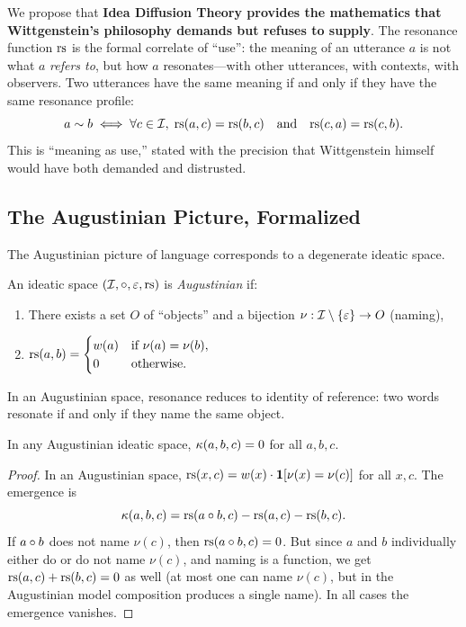 We propose that \textbf{Idea Diffusion Theory provides the mathematics that
Wittgenstein's philosophy demands but refuses to supply}. The resonance
function $\mathrm{rs}$ is the formal correlate of ``use'': the meaning of an
utterance $a$ is not what $a$ \emph{refers to}, but how $a$ resonates---with
other utterances, with contexts, with observers. Two utterances have the same
meaning if and only if they have the same resonance profile:
\[
  a \sim b \iff \forall c \in \mathcal{I},\; \mathrm{rs}(a, c) = \mathrm{rs}(b, c)
  \quad\text{and}\quad \mathrm{rs}(c, a) = \mathrm{rs}(c, b).
\]
This is ``meaning as use,'' stated with the precision that Wittgenstein
himself would have both demanded and distrusted.


\subsection{The Augustinian Picture, Formalized}

The Augustinian picture of language corresponds to a degenerate ideatic space.

\begin{definition}
\label{def:augustinian}
An ideatic space $(\mathcal{I}, \circ, \varepsilon, \mathrm{rs})$ is \emph{Augustinian} if:
\begin{enumerate}
\item There exists a set $O$ of ``objects'' and a bijection $\nu : \mathcal{I} \setminus \{\varepsilon\} \to O$ (naming),
\item $\mathrm{rs}(a, b) = \begin{cases} w(a) & \text{if } \nu(a) = \nu(b), \\ 0 & \text{otherwise}.\end{cases}$
\end{enumerate}
In an Augustinian space, resonance reduces to identity of reference:
two words resonate if and only if they name the same object.
\end{definition}

\begin{proposition}
\label{prop:augustinian-zero-emergence}
In any Augustinian ideatic space, $\kappa(a, b, c) = 0$ for all $a, b, c$.
\end{proposition}

\begin{proof}
In an Augustinian space, $\mathrm{rs}(x, c) = w(x) \cdot \mathbf{1}[\nu(x) = \nu(c)]$
for all $x, c$. The emergence is
\[
\kappa(a,b,c) = \mathrm{rs}(a \circ b, c) - \mathrm{rs}(a, c) - \mathrm{rs}(b, c).
\]
If $a \circ b$ does not name $\nu(c)$, then $\mathrm{rs}(a \circ b, c) = 0$. But
since $a$ and $b$ individually either do or do not name $\nu(c)$, and naming
is a function, we get $\mathrm{rs}(a,c) + \mathrm{rs}(b,c) = 0$ as well (at most one can name
$\nu(c)$, but in the Augustinian model composition produces a single name).
In all cases the emergence vanishes.
\end{proof}

